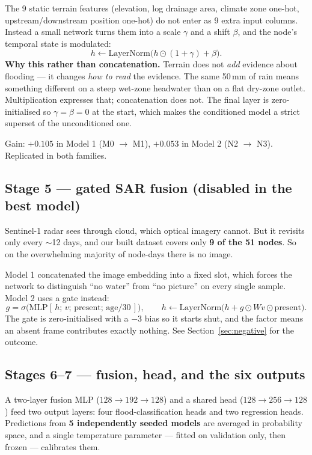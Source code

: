 \documentclass[11pt,a4paper]{article}
\begin{document}
The 9 static terrain features (elevation, log drainage area, climate zone
one-hot, upstream/downstream position one-hot) do not enter as 9 extra input
columns. Instead a small network turns them into a scale $\gamma$ and a shift
$\beta$, and the node's temporal state is modulated:
\[
h \leftarrow \mathrm{LayerNorm}\big(h \odot (1+\gamma) + \beta\big).
\]
\textbf{Why this rather than concatenation.} Terrain does not \emph{add}
evidence about flooding --- it changes \emph{how to read} the evidence. The same
50\,mm of rain means something different on a steep wet-zone headwater than on a
flat dry-zone outlet. Multiplication expresses that; concatenation does not. The
final layer is zero-initialised so $\gamma = \beta = 0$ at the start, which makes
the conditioned model a strict superset of the unconditioned one.

Gain: $+0.105$ in Model 1 (M0 $\to$ M1), $+0.053$ in Model 2 (N2 $\to$ N3).
Replicated in both families.

\subsection{Stage 5 --- gated SAR fusion (disabled in the best model)}

Sentinel-1 radar sees through cloud, which optical imagery cannot. But it
revisits only every $\sim$12 days, and our built dataset covers only \textbf{9 of
the 51 nodes}. So on the overwhelming majority of node-days there is no image.

Model 1 concatenated the image embedding into a fixed slot, which forces the
network to distinguish ``no water'' from ``no picture'' on every single sample.
Model 2 uses a gate instead:
\[
g = \sigma\big(\mathrm{MLP}[\,h;\, v;\, \text{present};\, \text{age}/30\,]\big),
\qquad
h \leftarrow \mathrm{LayerNorm}\big(h + g \odot W v \odot \text{present}\big).
\]
The gate is zero-initialised with a $-3$ bias so it starts shut, and the
 factor means an absent frame contributes exactly nothing.
See Section~\ref{sec:negative} for the outcome.

\subsection{Stages 6--7 --- fusion, head, and the six outputs}

A two-layer fusion MLP ($128 \to 192 \to 128$) and a shared head
($128 \to 256 \to 128$) feed two output layers: four flood-classification heads
and two regression heads. Predictions from \textbf{5 independently seeded models}
are averaged in probability space, and a single temperature parameter --- fitted
on validation only, then frozen --- calibrates them.
\end{document}
